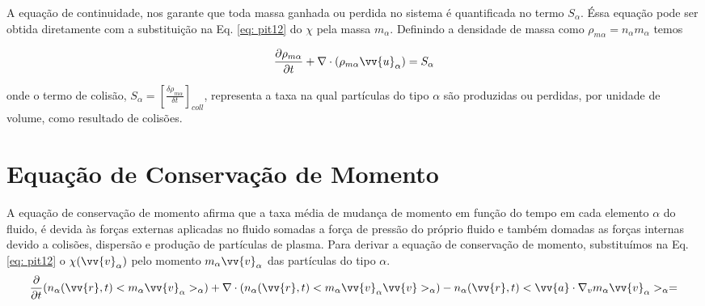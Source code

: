\documentclass[12pt,oneside,a4paper]{abntex2}
\begin{document}
A equação de continuidade, nos garante que toda massa ganhada ou perdida no sistema é quantificada no termo $S_\alpha$.
Éssa equação pode ser obtida diretamente com a substituição na Eq. \ref{eq: pit12} do $\chi$ pela massa $m_\alpha$. Definindo a densidade de massa como $ \rho_{m\alpha} = n_\alpha m_\alpha$ temos

\begin{equation}
\label{eq: pit13}
\frac{\partial \rho_{m\alpha}}{\partial t} + \nabla \cdot (\rho_{m\alpha} \vv{u}_\alpha)  = S_\alpha 
\end{equation}

onde o termo de colisão, $S_\alpha = \left[\frac{\delta \rho_{m\alpha}}{\delta t}\right]_{coll}$, representa a taxa na qual partículas do tipo $\alpha$ são produzidas ou perdidas, por unidade de volume, como resultado de colisões.

\section{Equação de Conservação de Momento}
A equação de conservação de momento afirma que a taxa média de mudança de momento em função do tempo em cada elemento $\alpha$ do fluido, é devida às forças externas aplicadas no fluido somadas a força de pressão do próprio fluido e também domadas as forças internas devido a colisões, dispersão e produção de partículas de plasma.
Para derivar a equação de conservação de momento, substituímos na Eq. \ref{eq: pit12} o $\chi (\vv{v}_\alpha)$ pelo momento $m_\alpha \vv{v}_\alpha$ das partículas do tipo $\alpha$. 
\begin{equation}
\label{eq: p2}
\frac{\partial }{\partial t}(n_\alpha(\vv{r},t)<m_\alpha \vv{v}_\alpha>_\alpha) + \nabla \cdot (n_\alpha(\vv{r},t)<m_\alpha \vv{v}_\alpha \vv{v} >_\alpha) - n_\alpha(\vv{r},t)<\vv{a} \cdot \nabla_v m_\alpha \vv{v}_\alpha>_\alpha = 
\end{equation}
\end{document}

